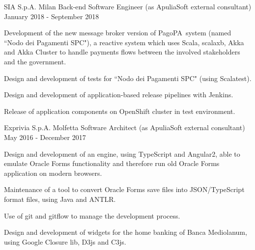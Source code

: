 \documentclass{resume} %
\begin{document}

\cvEntry
  {SIA S.p.A.}
  {Milan}
  {Back-end Software Engineer (as ApuliaSoft external consultant)}
  {January 2018 - September 2018}{
    \begin{cvEntryItems}
      \item Development of the new message broker version of PagoPA\textregistered~system
            (named ``Nodo dei Pagamenti SPC"), a reactive system which uses Scala, scalaxb, Akka
            and Akka Cluster to handle payments flows between the involved stakeholders and the
            government.
      \item Design and development of tests for ``Nodo dei Pagamenti SPC" (using Scalatest).
      \item Design and development of application-based release pipelines with Jenkins.
      \item Release of application components on OpenShift cluster in test environment.
    \end{cvEntryItems}
  }


\cvEntry
  {Exprivia S.p.A.}
  {Molfetta}
  {Software Architect (as ApuliaSoft external consultant)}
  {May 2016 - December 2017}{
    \begin{cvEntryItems}
      \item Design and development of an engine, using TypeScript and Angular2, able to
            emulate Oracle Forms functionality and therefore run old Oracle Forms application
            on modern browsers.
      \item Maintenance of a tool to convert Oracle Forms save files into JSON/TypeScript
            format files, using Java and ANTLR.
      \item Use of git and gitflow to manage the development process.
      \item Design and development of widgets for the home banking of Banca Mediolanum,
            using Google Closure lib, D3js and C3js.
    \end{cvEntryItems}
  }

\end{document}
